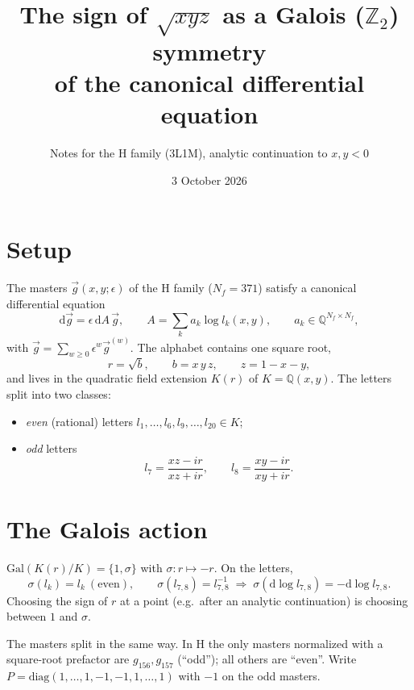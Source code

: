 \documentclass[11pt]{article}
\title{The sign of $\sqrt{xyz}$ as a Galois ($\mathbb{Z}_2$) symmetry\\ of the canonical differential equation}
\author{Notes for the H family (3L1M), analytic continuation to $x,y<0$}
\date{3 October 2026}
\newcommand{\dd}{\mathrm{d}}
\begin{document}
\maketitle

\section{Setup}
The masters $\vec g(x,y;\epsilon)$ of the H family ($N_f=371$) satisfy a canonical
differential equation
\begin{equation}
  \dd \vec g = \epsilon\, \dd A\, \vec g ,\qquad
  A = \sum_{k} a_k \log l_k(x,y), \qquad a_k\in\mathbb{Q}^{N_f\times N_f},
\end{equation}
with $\vec g = \sum_{w\ge0} \epsilon^w \vec g^{(w)}$. The alphabet contains one square root,
\begin{equation}
  r=\sqrt{b},\qquad b = x\,y\,z,\qquad z = 1-x-y ,
\end{equation}
and lives in the quadratic field extension $K(r)$ of $K=\mathbb{Q}(x,y)$.
The letters split into two classes:
\begin{itemize}
\item \emph{even} (rational) letters $l_1,\dots,l_6,l_9,\dots,l_{20}\in K$;
\item \emph{odd} letters
\begin{equation}
  l_7=\frac{x z - i r}{x z + i r},\qquad l_8=\frac{x y - i r}{x y + i r}.
\end{equation}
\end{itemize}

\section{The Galois action}
$\mathrm{Gal}(K(r)/K)=\{1,\sigma\}$ with $\sigma: r\mapsto -r$. On the letters,
\begin{equation}
  \sigma(l_k)=l_k \ (\text{even}),\qquad \sigma(l_{7,8}) = l_{7,8}^{-1}
  \;\Rightarrow\; \sigma(\dd\log l_{7,8}) = -\dd\log l_{7,8} .
\end{equation}
Choosing the sign of $r$ at a point (e.g.\ after an analytic continuation) is choosing
between $1$ and $\sigma$.

The masters split in the same way. In H the only masters normalized with a square-root
prefactor are $g_{156}, g_{157}$ (``odd''); all others are ``even''. Write
$P=\mathrm{diag}(1,\dots,1,-1,-1,1,\dots,1)$ with $-1$ on the odd masters.
\end{document}

